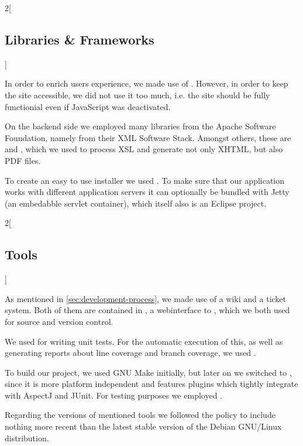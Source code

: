 \begin{multicols}{2}[\subsection{Libraries \& Frameworks}]
\label{sec:libraries-and-frameworks}

In order to enrich users experience, we made use of . However, in order to keep the site accessible, we did not use it too much, i.e. the site should be fully functionial even if JavaScript was deactivated.

On the backend side we employed many libraries from the Apache Software Foundation, namely from their XML Software Stack. Amongst others, these are  and , which we used to process XSL and generate not only XHTML, but also PDF files.

To create an easy to use installer we used . To make sure that our application works with different application servers it can optionally be bundled with Jetty (an embedabble servlet container), which itself also is an Eclipse project.


\end{multicols}
\begin{multicols}{2}[\subsection{Tools}]
\label{sec:tools}

As mentioned in \autoref{sec:development-process}, we made use of a wiki and a ticket system. Both of them are contained in , a webinterface to , which we both used for source and version control.

We used  for writing unit tests. For the automatic execution of this, as well as generating reports about line coverage and branch coverage, we used .

To build our project, we used GNU Make initially, but later on we switched to , since it is more platform independent and features plugins which tightly integrate with AspectJ and JUnit. For testing purposes we employed .

Regarding the versions of mentioned tools we followed the policy to include nothing more recent than the latest stable version of the Debian GNU/Linux distribution.


\end{multicols}
